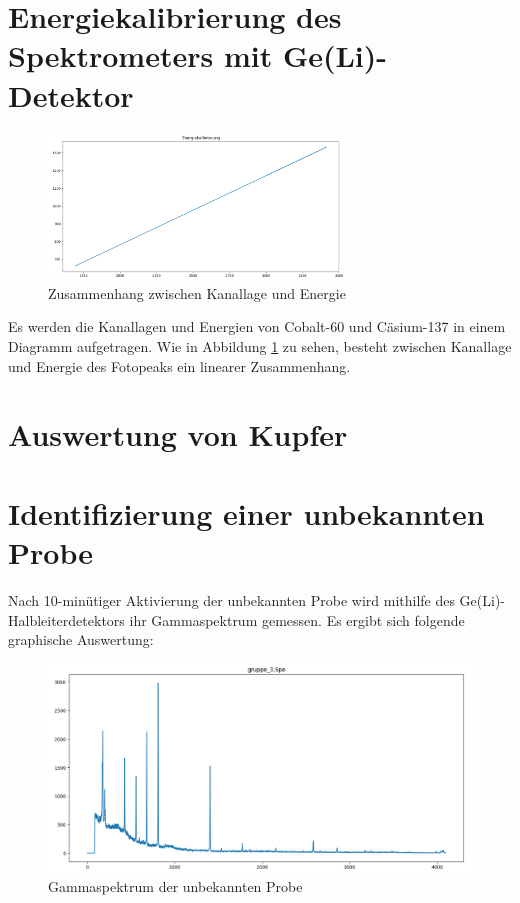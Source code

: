 \documentclass[12pt,german]{article}
\begin{document}
    \section{Energiekalibrierung des Spektrometers mit Ge(Li)-Detektor}
    \begin{figure}[H]
        \centering
        \includegraphics[width=0.7\textwidth]{pics/energiekalibrierung.png}
        \caption{Zusammenhang zwischen Kanallage und Energie}
        \label{fig:kanalenergie}
    \end{figure}
    Es werden die Kanallagen und Energien von Cobalt-60 und Cäsium-137 in einem Diagramm aufgetragen.
    Wie in Abbildung \ref{fig:kanalenergie} zu sehen, besteht zwischen Kanallage und  Energie des Fotopeaks ein linearer Zusammenhang.

    \section{Auswertung von Kupfer}



    \section{Identifizierung einer unbekannten Probe}
    Nach 10-minütiger Aktivierung der unbekannten Probe wird mithilfe des Ge(Li)-Halbleiterdetektors ihr Gammaspektrum gemessen. Es ergibt sich folgende graphische Auswertung: \\
    \begin{figure}[H]
        \centering
        \includegraphics[width=1.0\textwidth]{pics/gruppe_3.png}
        \caption{Gammaspektrum der unbekannten Probe}
    \end{figure}
\end{document}
